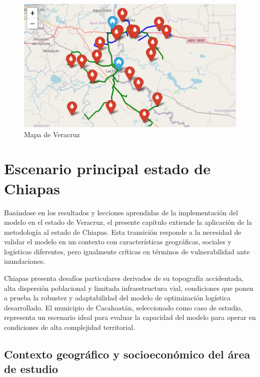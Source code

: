 \documentclass[
  spanish,
  us-letterpaper,
]{scrreprt}
\numberwithin{equation}{chapter} %
\begin{document}
\begin{figure}[H]

{\centering \includegraphics[width=0.9\linewidth,height=\textheight,keepaspectratio]{chapters/mapa_veracruz2.png}

}

\caption{Mapa de Veracruz}

\end{figure}%


\chapter{Escenario principal estado de
Chiapas}\label{escenario-principal-estado-de-chiapas}

Basándose en los resultados y lecciones aprendidas de la implementación
del modelo en el estado de Veracruz, el presente capítulo extiende la
aplicación de la metodología al estado de Chiapas. Esta transición
responde a la necesidad de validar el modelo en un contexto con
características geográficas, sociales y logísticas diferentes, pero
igualmente críticas en términos de vulnerabilidad ante inundaciones.

Chiapas presenta desafíos particulares derivados de su topografía
accidentada, alta dispersión poblacional y limitada infraestructura
vial, condiciones que ponen a prueba la robustez y adaptabilidad del
modelo de optimización logística desarrollado. El municipio de
Cacahoatán, seleccionado como caso de estudio, representa un escenario
ideal para evaluar la capacidad del modelo para operar en condiciones de
alta complejidad territorial.

\section{Contexto geográfico y socioeconómico del área de
estudio}\label{contexto-geogruxe1fico-y-socioeconuxf3mico-del-uxe1rea-de-estudio}
\end{document}
